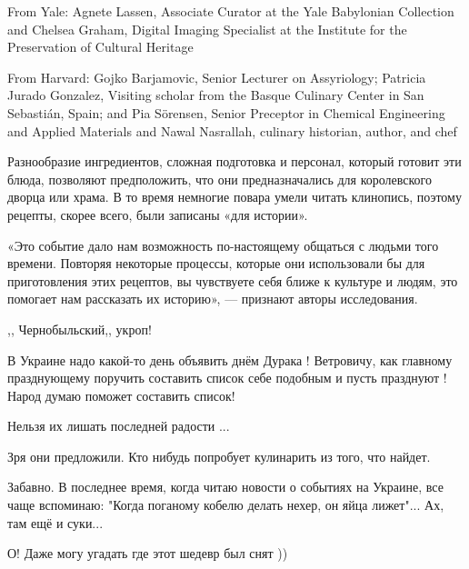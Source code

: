 \begin{itemize}
\begin{multicols}{2}
From Yale: Agnete Lassen, Associate Curator at the Yale Babylonian Collection
and Chelsea Graham, Digital Imaging Specialist at the Institute for the
Preservation of Cultural Heritage

From Harvard: Gojko Barjamovic, Senior Lecturer on Assyriology; Patricia Jurado
Gonzalez, Visiting scholar from the Basque Culinary Center in San Sebastián,
Spain; and Pia Sörensen, Senior Preceptor in Chemical Engineering and Applied
Materials and Nawal Nasrallah, culinary historian, author, and chef

Разнообразие ингредиентов, сложная подготовка и персонал, который готовит эти
блюда, позволяют предположить, что они предназначались для королевского дворца
или храма. В то время немногие повара умели читать клинопись, поэтому рецепты,
скорее всего, были записаны «для истории».

«Это событие дало нам возможность по-настоящему общаться с людьми того времени.
Повторяя некоторые процессы, которые они использовали бы для приготовления этих
рецептов, вы чувствуете себя ближе к культуре и людям, это помогает нам
рассказать их историю», — признают авторы исследования.

\end{multicols}

,, Чернобыльский,, укроп!


В Украине надо какой-то день объявить днём Дурака ! Ветровичу, как главному
празднующему поручить составить список себе подобным и пусть празднуют ! Народ
думаю поможет составить список!

Нельзя их лишать последней радости ...

Зря они предложили. Кто нибудь попробует кулинарить из того, что найдет.

Забавно.
В последнее время, когда читаю новости о событиях на Украине, все чаще вспоминаю: "Когда поганому кобелю делать нехер, он яйца лижет"... Ах, там ещё и суки...

О! Даже могу угадать где этот шедевр был снят ))

\end{itemize} %
